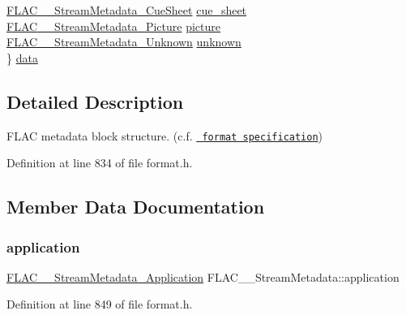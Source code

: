 \begin{DoxyCompactItemize}
\begin{tabbing}
\>\mbox{\hyperlink{struct_f_l_a_c_____stream_metadata___cue_sheet}{FLAC\_\_StreamMetadata\_CueSheet}} \mbox{\hyperlink{struct_f_l_a_c_____stream_metadata_a68e7d388eeb7e35076e016370a74e0ec}{cue\_sheet}}\\
\>\mbox{\hyperlink{struct_f_l_a_c_____stream_metadata___picture}{FLAC\_\_StreamMetadata\_Picture}} \mbox{\hyperlink{struct_f_l_a_c_____stream_metadata_a203cf5cce24097ef96efd5dd3bb7c8e7}{picture}}\\
\>\mbox{\hyperlink{struct_f_l_a_c_____stream_metadata___unknown}{FLAC\_\_StreamMetadata\_Unknown}} \mbox{\hyperlink{struct_f_l_a_c_____stream_metadata_ac29528515ea884b108a813a6609515bd}{unknown}}\\
\} \mbox{\hyperlink{struct_f_l_a_c_____stream_metadata_aae397640681a6d19beba008d40410644}{data}}\\

\end{tabbing}\end{DoxyCompactItemize}


\subsection{Detailed Description}
F\+L\+AC metadata block structure. (c.\+f. \href{../format.html\#metadata_block}{\texttt{ format specification}}) 

Definition at line 834 of file format.\+h.



\subsection{Member Data Documentation}
\mbox{\label{struct_f_l_a_c_____stream_metadata_af16b029d4a476aeb46f9a215e2cce462}} 
\subsubsection{\texorpdfstring{application}{application}}
{\footnotesize\ttfamily \mbox{\hyperlink{struct_f_l_a_c_____stream_metadata___application}{F\+L\+A\+C\+\_\+\+\_\+\+Stream\+Metadata\+\_\+\+Application}} F\+L\+A\+C\+\_\+\+\_\+\+Stream\+Metadata\+::application}



Definition at line 849 of file format.\+h.

